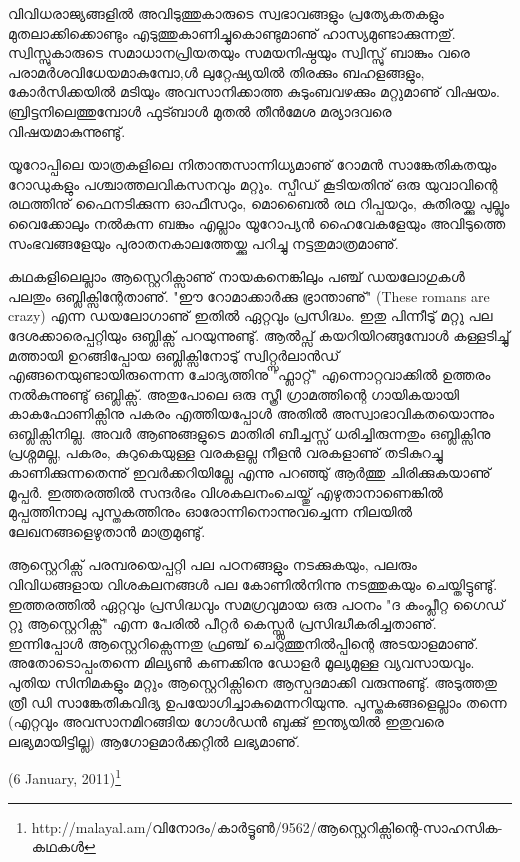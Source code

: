 വിവിധരാജ്യങ്ങളില്‍ അവിടുത്തുകാരുടെ സ്വഭാവങ്ങളും പ്രത്യേകതകളും മുതലാക്കിക്കൊണ്ടും എടുത്തുകാണിച്ചുകൊണ്ടുമാണു് 
ഹാസ്യമുണ്ടാക്കുന്നതു്. സ്വിസ്സുകാരുടെ സമാധാനപ്രിയതയും സമയനിഷ്ഠയും സ്വിസ്സു് ബാങ്കും 
വരെ പരാമര്‍ശവിധേയമാകുമ്പോ,ള്‍ ലുറ്റേഷ്യയില്‍ തിരക്കും ബഹളങ്ങളും, കോര്‍സിക്കയില്‍ മടിയും അവസാനിക്കാത്ത 
കുടുംബവഴക്കും മറ്റുമാണു് വിഷയം. ബ്രിട്ടനിലെത്തുമ്പോള്‍ ഫുട്ബാള്‍ മുതല്‍ തീന്‍മേശ മര്യാദവരെ വിഷയമാകുന്നുണ്ടു്.

യൂറോപ്പിലെ യാത്രകളിലെ നിതാന്തസാന്നിധ്യമാണു് റോമന്‍ സാങ്കേതികതയും റോഡുകളും പശ്ചാത്തലവികസനവും മറ്റും. 
സ്പീഡ് കൂടിയതിനു് ഒരു യുവാവിന്റെ രഥത്തിനു് ഫൈനടിക്കുന്ന ഓഫീസറും, മൊബൈല്‍ രഥ റിപ്പയറും, കുതിരയ്ക്കു പുല്ലും 
വൈക്കോലും നല്‍കുന്ന ബങ്കും എല്ലാം യൂറോപ്യന്‍ ഹൈവേകളേയും അവിടുത്തെ സംഭവങ്ങളേയും പുരാതനകാലത്തേയ്ക്കു 
പറിച്ചു നട്ടതുമാത്രമാണു്.

കഥകളിലെല്ലാം ആസ്റ്റെറിക്സാണു് നായകനെങ്കിലും പഞ്ച് ഡയലോഗുകള്‍ പലതും ഒബ്ലിക്സിന്റേതാണു്. "ഈ റോമാക്കാര്‍ക്കു 
ഭ്രാന്താണു്" (These romans are crazy) എന്ന ഡയലോഗാണു് ഇതില്‍ ഏറ്റവും പ്രസിദ്ധം. ഇതു പിന്നീടു് മറ്റു പല 
ദേശക്കാരെപ്പറ്റിയും ഒബ്ലിക്സ് പറയുന്നുണ്ടു്. ആല്‍പ്സ് കയറിയിറങ്ങുമ്പോള്‍ കള്ളടിച്ചു് മത്തായി ഉറങ്ങിപ്പോയ 
ഒബ്ലിക്സിനോടു് സ്വിറ്റ്സര്‍ലാന്‍ഡ് എങ്ങനെയുണ്ടായിരുന്നെന്ന ചോദ്യത്തിനു "ഫ്ലാറ്റ്" എന്നൊറ്റവാക്കില്‍ ഉത്തരം 
നല്‍കുന്നുണ്ടു് ഒബ്ലിക്സ്. അതുപോലെ ഒരു സ്ത്രീ ഗ്രാമത്തിന്റെ ഗായികയായി കാകഫോണിക്സിനു പകരം എത്തിയപ്പോള്‍ 
അതില്‍ അസ്വാഭാവികതയൊന്നും ഒബ്ലിക്സിനില്ല. അവര്‍ ആണുങ്ങളുടെ മാതിരി ബീച്ചസ്സ് ധരിച്ചിരുന്നതും ഒബ്ലിക്സിനു 
പ്രശ്നമല്ല, പകരം, കുറുകെയുള്ള വരകളല്ല നീളന്‍ വരകളാണു് തടികുറച്ചു കാണിക്കുന്നതെന്നു് ഇവര്‍ക്കറിയില്ലേ എന്നു 
പറഞ്ഞു് ആര്‍ത്തു ചിരിക്കുകയാണു് മൂപ്പര്‍. ഇത്തരത്തില്‍ സന്ദര്‍ഭം വിശകലനംചെയ്തു് എഴുതാനാണെങ്കില്‍ മുപ്പത്തിനാലു 
പുസ്തകത്തിനും ഓരോന്നിനൊന്നുവച്ചെന്ന നിലയില്‍ ലേഖനങ്ങളെഴുതാന്‍ മാത്രമുണ്ടു്.

ആസ്റ്റെറിക്സ് പരമ്പരയെപ്പറ്റി പല പഠനങ്ങളും നടക്കുകയും, പലരും വിവിധങ്ങളായ വിശകലനങ്ങള്‍ പല കോണില്‍നിന്നു
നടത്തുകയും ചെയ്തിട്ടുണ്ടു്. ഇത്തരത്തില്‍ ഏറ്റവും പ്രസിദ്ധവും സമഗ്രവുമായ ഒരു പഠനം "ദ കംപ്ലീറ്റ ഗൈഡ് റ്റു ആസ്റ്റെറിക്സ്"
എന്ന പേരില്‍ പീറ്റര്‍ കെസ്സ്ലര്‍ പ്രസിദ്ധീകരിച്ചതാണു്. ഇന്നിപ്പോള്‍ ആസ്റ്റെറിക്സെന്നതു ഫ്രഞ്ച് ചെറുത്തുനില്‍പ്പിന്റെ 
അടയാളമാണു്. അതോടൊപ്പംതന്നെ മില്യണ്‍ കണക്കിനു ഡോളര്‍ മൂല്യമുള്ള വ്യവസായവും. പുതിയ സിനിമകളും മറ്റും
ആസ്റ്റെറിക്സിനെ ആസ്പദമാക്കി വരുന്നുണ്ടു്. അടുത്തതു ത്രീ ഡി സാങ്കേതികവിദ്യ ഉപയോഗിച്ചാകുമെന്നറിയുന്നു. 
പുസ്തകങ്ങളെല്ലാം തന്നെ (എറ്റവും അവസാനമിറങ്ങിയ ഗോള്‍ഡന്‍ ബുക്കു് ഇന്ത്യയില്‍ ഇതുവരെ ലഭ്യമായിട്ടില്ല) 
ആഗോളമാര്‍ക്കറ്റില്‍ ലഭ്യമാണു്.

\hspace*{2em}(6 January, 2011)\footnote{http://malayal.am/വിനോദം/കാര്‍ട്ടൂണ്‍/9562/ആസ്റ്റെറിക്സിന്റെ-സാഹസിക-കഥകള്‍}

\newpage
